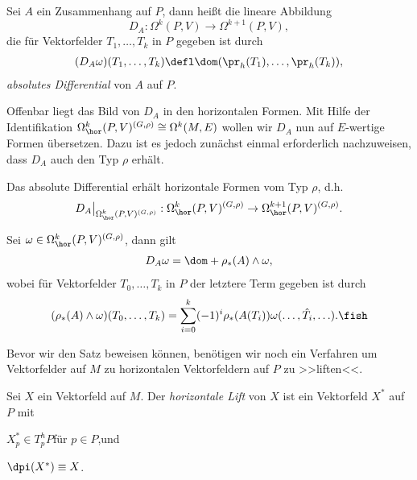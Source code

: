 \documentclass[%
	paper=a5,%
	fleqn,%
	DIV=18,%
	BCOR=0mm,
	fontsize=11pt,
	titlepage=false,%
	bibliography=totoc,
	DIV=18,%
	twoside=true,
	pdftitle=Riemannsche Geometrie,
	pdfauthor=Uwe Semmelmann,
	numbers=noendperiod]%
	{scrbook}
\begin{document}
\begin{defn}
Sei $A$ ein Zusammenhang auf $P$, dann heißt die lineare Abbildung 
\[D_A :
\Omega^k(P,V)\to \Omega^{k+1}(P,V),\]
die für Vektorfelder $T_1,\ldots,T_k$ in $P$ gegeben ist durch
\begin{align*}
(D_A\omega)(T_1,\ldots,T_k) \defl \dom(\pr_h(T_1),\ldots,\pr_h(T_k)),
\end{align*}
\emph{absolutes Differential} von $A$ auf $P$.\fish
\end{defn}

Offenbar liegt das Bild von $D_A$ in den horizontalen Formen. Mit Hilfe der
Identifikation $\Omega_\hor^k(P,V)^{(G,\rho)}\cong \Omega^k(M,E)$ wollen wir
$D_A$ nun auf $E$-wertige Formen übersetzen. Dazu ist es jedoch zunächst einmal erforderlich nachzuweisen, dass
$D_A$ auch den Typ $\rho$ erhält.

\begin{prop}
\label{prop:Absolutes-Differential}
\begin{propenum}
\item Das absolute Differential erhält horizontale Formen vom Typ $\rho$, d.h.
\begin{align*}
D_A\big|_{\Omega_\hor^k(P,V)^{(G,\rho)}} : \Omega_\hor^k(P,V)^{(G,\rho)} \to
\Omega_\hor^{k+1}(P,V)^{(G,\rho)}.
\end{align*}
\item Sei $\omega\in\Omega_\hor^k(P,V)^{(G,\rho)}$, dann gilt
\begin{align*}
D_A\omega = \dom + \rho_*(A)\wedge \omega,
\end{align*}
wobei für Vektorfelder $T_0,\ldots,T_k$ in $P$ der letztere Term gegeben ist
durch
\begin{align*}
(\rho_*(A)\wedge \omega)(T_0,\ldots,T_k) = 
\sum_{i=0}^k (-1)^i \rho_*(A(T_i))\omega(\ldots,\hat{T}_i,\ldots).\fish
\end{align*}
\end{propenum}
\end{prop}

Bevor wir den Satz beweisen können, benötigen wir noch ein Verfahren um
Vektorfelder auf $M$ zu horizontalen Vektorfeldern auf $P$ zu >>liften<<. 

\begin{defn}
Sei $X$ ein Vektorfeld auf $M$. Der \emph{horizontale Lift} von $X$ ist ein
Vektorfeld $X^*$ auf $P$ mit
\begin{defnenum}
\item $X^*_p\in T_p^hP$\quad für $p\in P$,\quad und
\item $\dpi(X^*) \equiv X$.\fish
\end{defnenum}
\end{defn}
\end{document}
